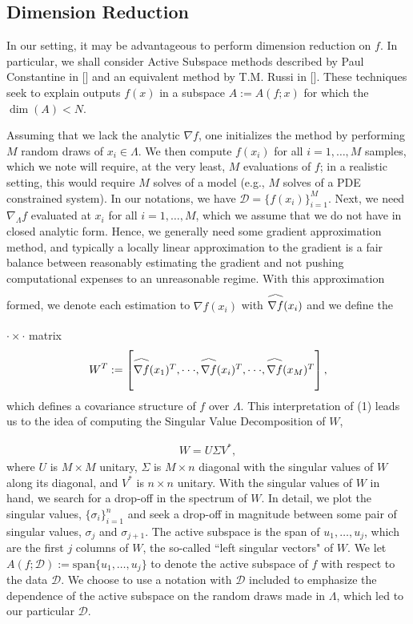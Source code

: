 \documentclass{amsart}
\newcommand\reallywidehat[1]{\arraycolsep=0pt\relax%
\begin{array}{c}
\stretchto{
  \scaleto{
    \scalerel*[\widthof{\ensuremath{#1}}]{\kern-.5pt\bigwedge\kern-.5pt}
    {\rule[-\textheight/2]{1ex}{\textheight}} %
  }{\textheight} %
}{0.5ex}\\           %
#1\\                 %
\rule{-1ex}{0ex}
\end{array}
}
\begin{document}
\subsection{Dimension Reduction}

In our setting, it may be advantageous to perform dimension reduction on $f$. In particular, we shall consider Active Subspace methods described by Paul Constantine in [] and an equivalent method by T.M. Russi in []. These techniques seek to explain outputs $f(x)$ in a subspace $A:=A(f;x)$ for which the $\dim (A) <N$. 

Assuming that we lack the analytic $\nabla f$, one initializes the method by performing $M$ random draws of $x_i \in \Lambda$. We then compute $f(x_i)$ for all $i=1,\ldots,M$ samples, which we note will require, at the very least, $M$ evaluations of $f$; in a realistic setting, this would require $M$ solves of a model (e.g., $M$ solves of a PDE constrained system). In our notations, we have $\mathcal{D}=\{f(x_i)\}_{i=1}^M$. Next, we need $\nabla_\Lambda f$ evaluated at $x_i$ for all $i=1,\ldots,M$, which we assume that we do not have in closed analytic form. Hence, we generally need some gradient approximation method, and typically a locally linear approximation to the gradient is a fair balance between reasonably estimating the gradient and not pushing computational expenses to an unreasonable regime. With this approximation formed, we denote each estimation to $\nabla f(x_i)$ with $\reallywidehat{\nabla f}(x_i)$ and we define the $\cdot \times \cdot$ matrix
\begin{eqnarray}
W^T:=\begin{bmatrix}
\reallywidehat{\nabla f}(x_1)^T,
\cdot \cdot \cdot,
\reallywidehat{\nabla f}(x_i)^T,
\cdot \cdot \cdot ,
\reallywidehat{\nabla f}(x_M)^T\\
\end{bmatrix},
\end{eqnarray} which defines a covariance structure of $f$ over $\Lambda$. This interpretation of (1) leads us to the idea of computing the Singular Value Decomposition of $W$,

\begin{eqnarray}
W=U\Sigma V^*,
\end{eqnarray} where $U$ is $M \times M$ unitary, $\Sigma$ is $M \times n$ diagonal with the singular values of $W$ along its diagonal, and $V^*$ is $n \times n$ unitary. With the singular values of $W$ in hand, we search for a drop-off in the spectrum of $W$. In detail, we plot the singular values, $\{\sigma_i\}_{i=1}^n$ and seek a drop-off in magnitude between some pair of singular values, $\sigma_{j}$ and $\sigma_{j+1}$. The active subspace is the span of $u_1,\ldots,u_{j}$, which are the first $j$ columns of $W$, the so-called ``left singular vectors" of $W$. We let $A\left(f;\mathcal{D}\right):=\text{span}\{u_1,\ldots,u_{j}\}$ to denote the active subspace of $f$ with respect to the data $\mathcal{D}$. We choose to use a notation with $\mathcal{D}$ included to emphasize the dependence of the active subspace on the random draws made in $\Lambda$, which led to our particular $\mathcal{D}$.
\end{document}
